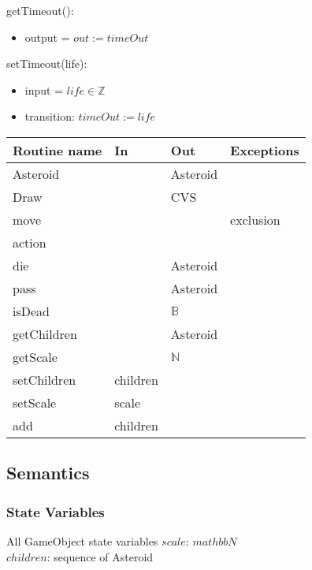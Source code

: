 \documentclass[12pt]{article}
\begin{document}
\noindent getTimeout():
\begin{itemize}
    \item output = $out := timeOut$
\end{itemize}

\noindent setTimeout(life):
\begin{itemize}
    \item input = $life \in \mathbb{Z}$
    \item transition: $timeOut := life$
\end{itemize}

\newpage

\begin{tabular}{| l | l | l | l |}
    \hline
    \textbf{Routine name} & \textbf{In} & \textbf{Out} & \textbf{Exceptions}\\
    \hline
    Asteroid & ~ & Asteroid & ~\\
    \hline
    Draw & ~ & CVS & ~\\
    \hline
    move & ~ & ~ & exclusion\\
    \hline
    action & ~ & ~ & ~\\
    \hline
    die & ~ & Asteroid & ~\\
    \hline
    pass & ~ & Asteroid & ~\\
    \hline
    isDead & ~ & $\mathbb{B}$ & ~\\
    \hline
    getChildren & ~ & Asteroid & ~\\
    \hline
    getScale & ~ & $\mathbb{N}$ & ~\\
    \hline
    setChildren & children & ~ & ~\\
    \hline
    setScale & scale & ~ & ~\\
    \hline
    add & children & ~ & ~\\
    \hline
\end{tabular}

\subsection* {Semantics}

\subsubsection* {State Variables}

All GameObject state variables
$scale$: $mathbb{N}$\\
$children$: sequence of Asteroid\\
\end{document}
